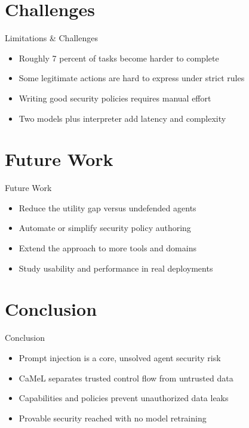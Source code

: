 \documentclass[10pt]{beamer}
\begin{document}
\section{Challenges}
\begin{frame}{Limitations \& Challenges}
\begin{itemize}
  \item Roughly 7 percent of tasks become harder to complete
  \item Some legitimate actions are hard to express under strict rules
  \item Writing good security policies requires manual effort
  \item Two models plus interpreter add latency and complexity
\end{itemize}
\end{frame}

\section{Future Work}
\begin{frame}{Future Work}
\begin{itemize}
  \item Reduce the utility gap versus undefended agents
  \item Automate or simplify security policy authoring
  \item Extend the approach to more tools and domains
  \item Study usability and performance in real deployments
\end{itemize}
\end{frame}

\section{Conclusion}
\begin{frame}{Conclusion}
\begin{itemize}
  \item Prompt injection is a core, unsolved agent security risk
  \item CaMeL separates trusted control flow from untrusted data
  \item Capabilities and policies prevent unauthorized data leaks
  \item Provable security reached with no model retraining
\end{itemize}
\end{frame}
\end{document}
